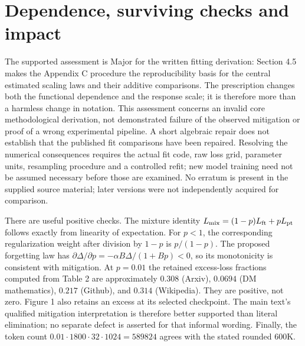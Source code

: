\documentclass[10pt]{article}
\begin{document}
\section*{Dependence, surviving checks and impact}
The supported assessment is Major for the written fitting derivation: Section 4.5 makes the Appendix C procedure the reproducibility basis for the central estimated scaling laws and their additive comparisons. The prescription changes both the functional dependence and the response scale; it is therefore more than a harmless change in notation. This assessment concerns an invalid core methodological derivation, not demonstrated failure of the observed mitigation or proof of a wrong experimental pipeline. A short algebraic repair does not establish that the published fit comparisons have been repaired. Resolving the numerical consequences requires the actual fit code, raw loss grid, parameter units, resampling procedure and a controlled refit; new model training need not be assumed necessary before those are examined. No erratum is present in the supplied source material; later versions were not independently acquired for comparison.\par
There are useful positive checks. The mixture identity \(L_{\rm mix}=(1-p)L_{\rm ft}+pL_{\rm pt}\) follows exactly from linearity of expectation. For \(p<1\), the corresponding regularization weight after division by \(1-p\) is \(p/(1-p)\). The proposed forgetting law has \(\partial\Delta/\partial p=-\alpha B\Delta/(1+Bp)<0\), so its monotonicity is consistent with mitigation. At \(p=0.01\) the retained excess-loss fractions computed from Table 2 are approximately \(0.308\) (Arxiv), \(0.0694\) (DM mathematics), \(0.217\) (Github), and \(0.314\) (Wikipedia). They are positive, not zero. Figure 1 also retains an excess at its selected checkpoint. The main text’s qualified mitigation interpretation is therefore better supported than literal elimination; no separate defect is asserted for that informal wording. Finally, the token count \(0.01\cdot1800\cdot32\cdot1024=589824\) agrees with the stated rounded \(600\)K.\par
\end{document}
